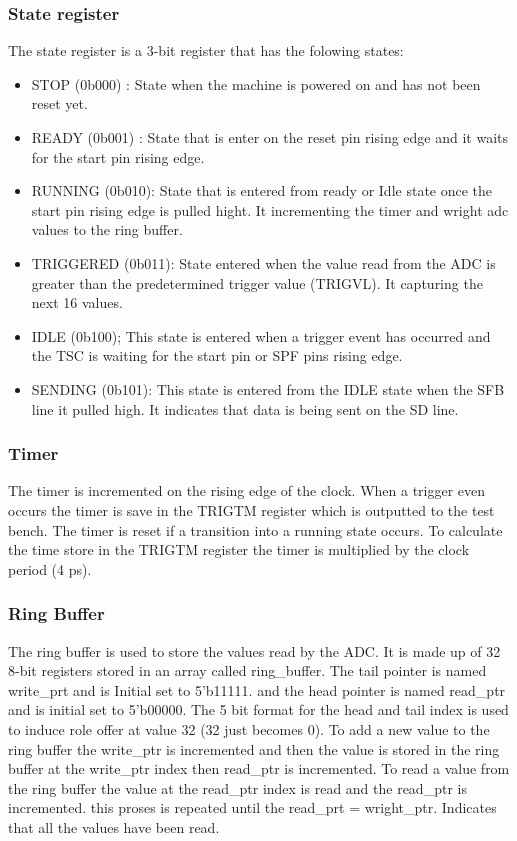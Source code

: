 \subsubsection{State register}
The state register is a 3-bit register that has the folowing states:
\begin{itemize}
      \item STOP (0b000) :
            State when the machine is powered on and has not been reset yet.
      \item READY (0b001) :
            State that is enter on the reset pin rising edge and it waits for the start pin rising edge.
      \item RUNNING (0b010):
            State that is entered from ready or Idle state once the start pin rising edge is pulled hight.
            It incrementing the timer and wright adc values to the ring buffer.
      \item TRIGGERED (0b011):
            State entered when the value read from the ADC is
            greater than the predetermined trigger value (TRIGVL).
            It capturing the next 16 values.
      \item IDLE (0b100);
            This state is entered when a trigger event has occurred
            and the TSC is waiting for the start pin or SPF pins rising edge.
      \item SENDING (0b101):
            This state is entered from the IDLE state when the SFB line it pulled high.
            It indicates that data is being sent on the SD line.
\end{itemize}


\subsubsection{Timer}
The timer is incremented on the rising edge of the clock. When
a trigger even occurs the timer is save in the TRIGTM register which is outputted to the test bench.
The timer is reset if a transition into a running state occurs.
To calculate the time store in the TRIGTM register the timer is multiplied by the clock period (4 ps).


\subsubsection{Ring Buffer}
The ring buffer is used to store the values read by the ADC.
It is made up of 32 8-bit registers stored in an array called ring\_buffer.
The tail pointer is named write\_prt and is Initial set to 5'b11111.
and the head pointer is named read\_ptr and is initial set to 5'b00000.
The 5 bit format for the head and tail index is used to induce role offer at value 32 (32 just becomes 0).
To add a new value to the ring buffer the write\_ptr is incremented and then the
value is stored in the ring buffer at the write\_ptr index then read\_ptr is incremented.
To read a value from the ring buffer the value at the read\_ptr index is read and the read\_ptr is incremented.
this proses is repeated until the read\_prt = wright\_ptr. Indicates that all the values have been read.

